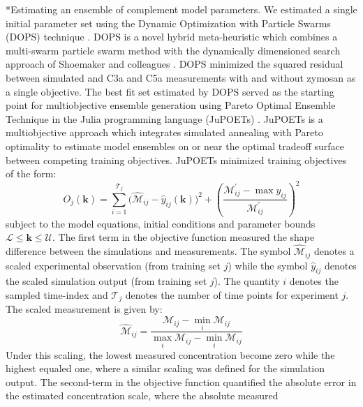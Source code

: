 \documentclass[12pt]{article}
\makeatletter
\renewcommand\subsection{\@startsection
	{subsection}{2}{0mm}
	{-0.05in}
	{-0.5\baselineskip}
	{\normalfont\normalsize\bfseries}}
\makeatother
\begin{document}
\subsection*{Estimating an ensemble of complement model parameters.}
We estimated a single initial parameter set using the Dynamic Optimization with Particle Swarms (DOPS) technique \cite{DOPS2016}.
DOPS is a novel hybrid meta-heuristic which combines a multi-swarm particle swarm method with the dynamically dimensioned search approach of Shoemaker and colleagues \cite{Tolson2007}.
DOPS minimized the squared residual between simulated and C3a and C5a measurements with and without zymosan as a single objective.
The best fit set estimated by DOPS served as the starting point for multiobjective ensemble generation using Pareto Optimal Ensemble Technique in the Julia programming language (JuPOETs) \cite{JuPOETs-BioArXiv}.
JuPOETs is a multiobjective approach which integrates simulated annealing with Pareto optimality to estimate model ensembles on or near the optimal tradeoff surface between competing training objectives. JuPOETs minimized training objectives of the form:
\begin{equation}\label{eqn_cost2}
	O_{j}(\mathbf{k}) = \sum_{i=1}^{\mathcal{T}_{j}}\biggl(\hat{\mathcal{M}}_{ij}-\hat{y}_{ij}(\mathbf{k})\biggr)^2 + \left(\frac{{\mathcal{M}^{\prime}_{ij}}-\max{y_{ij}}}{{\mathcal{M}^{\prime}_{ij}}}\right)^{2}
\end{equation}subject to the model equations, initial conditions and parameter bounds $\mathcal{L}\leq\mathbf{k}\leq\mathcal{U}$.
The first term in the objective function measured the shape difference between the simulations and measurements.
The symbol $\hat{\mathcal{M}}_{ij}$ denotes a scaled experimental observation (from training set $j$) while the symbol $\hat{y}_{ij}$ denotes the scaled simulation output (from training set $j$). The quantity $i$ denotes the sampled time-index and $\mathcal{T}_{j}$ denotes the number of time points for experiment $j$.
The scaled measurement is given by:
\begin{equation}\label{norm_exp_data}
\hat{\mathcal{M}}_{ij} = \frac{\mathcal{M}_{ij} - \min_{i}\mathcal{M}_{ij}}{\max_{i}{\mathcal{M}_{ij}}-\min_{i}{\mathcal{M}_{ij}}}
\end{equation}
Under this scaling, the lowest measured concentration become zero while the highest equaled one, where a similar scaling was defined for the simulation output.
The second-term in the objective function quantified the absolute error in the estimated concentration scale, where the absolute measured
\end{document}
